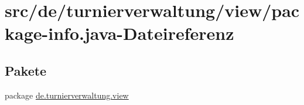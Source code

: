 \hypertarget{view_2package-info_8java}{}\section{src/de/turnierverwaltung/view/package-\/info.java-\/\+Dateireferenz}
\label{view_2package-info_8java}
\subsection*{Pakete}
\begin{DoxyCompactItemize}
\item 
package \hyperlink{namespacede_1_1turnierverwaltung_1_1view}{de.\+turnierverwaltung.\+view}
\end{DoxyCompactItemize}
